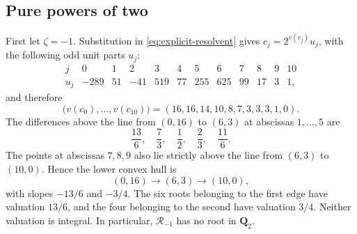 \subsection{Pure powers of two}

First let $\zeta=-1$.  Substitution in
\eqref{eq:explicit-resolvent} gives
$c_j=2^{v(c_j)}u_j$, with the following odd unit parts $u_j$:
\[
\begin{array}{c|rrrrrrrrrrr}
j&0&1&2&3&4&5&6&7&8&9&10\\ \hline
u_j
&-289&51&-41&519&77&255&625&99&17&3&1,
\end{array}
\]
and therefore
\[
 \bigl(v(c_0),\ldots,v(c_{10})\bigr)
 =(16,16,14,10,8,7,3,3,3,1,0).
\]
The differences above the line from $(0,16)$ to $(6,3)$ at abscissas
$1,\ldots,5$ are
\[
 \frac{13}{6},\quad\frac73,\quad\frac12,\quad\frac23,
 \quad\frac{11}{6}.
\]
The points at abscissas $7,8,9$ also lie strictly above the line from
$(6,3)$ to $(10,0)$.  Hence the lower convex hull is
\[
 (0,16)\longrightarrow(6,3)\longrightarrow(10,0),
\]
with slopes $-13/6$ and $-3/4$.  The six roots belonging to the first
edge have valuation $13/6$, and the four belonging to the second have
valuation $3/4$.  Neither valuation is integral.  In particular,
$\mathcal R_{-1}$ has no root in $\mathbf Q_2$.

